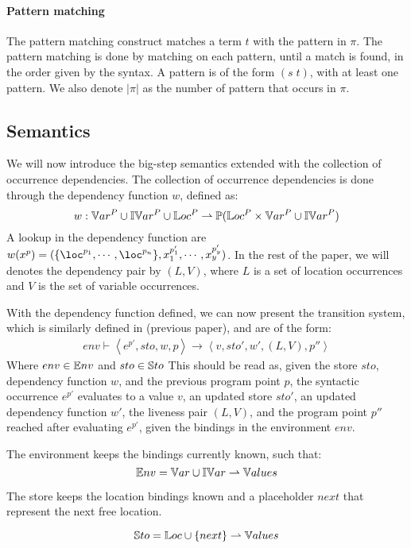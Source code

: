 \documentclass[../../master.tex]{subfiles}
\begin{document}
\paragraph{Pattern matching}
The pattern matching construct matches a term $t$ with the pattern in $\pi$.
The pattern matching is done by matching on each pattern, until a match is found, in the order given by the syntax.
A pattern is of the form $(s\;t)$, with at least one pattern.
We also denote $|\pi|$ as the number of pattern that occurs in $\pi$.

\subsection{Semantics}\label{sec:sem}
We will now introduce the big-step semantics extended with the collection of occurrence dependencies.
The collection of occurrence dependencies is done through the dependency function $w$, defined as:
$$w:\mathbb{V}ar^P\cup\mathbb{IV}ar^P\cup\mathbb{L}oc^P\rightharpoonup\mathbb{P}(\mathbb{L}oc^P\times\mathbb{V}ar^P\cup\mathbb{IV}ar^P)$$
A lookup in the dependency function are $w(x^p)=(\{\loc^{p_1},\cdots,\loc^{p_n}\},x_1^{p'_1},\cdots,x_y^{p'_y})$.
In the rest of the paper, we will denotes the dependency pair by $(L,V)$, where $L$ is a set of location occurrences and $V$ is the set of variable occurrences.

With the dependency function defined, we can now present the transition system, which is similarly defined in (previous paper), and are of the form:
\begin{align*}
env\vdash\left\langle e^{p'},sto,w,p\right\rangle\rightarrow\left\langle v,sto',w',(L,V),p''\right\rangle
\end{align*}
Where $env\in\mathbb{E}nv$ and $sto\in\mathbb{S}to$
This should be read as, given the store $sto$, dependency function $w$, and the previous program point $p$, the syntactic occurrence $e^{p'}$ evaluates to a value $v$, an updated store $sto'$, an updated dependency function $w'$, the liveness pair $(L,V)$, and the program point $p''$ reached after evaluating $e^{p'}$, given the bindings in the environment $env$.

The environment keeps the bindings currently known, such that:
$$\mathbb{E}nv=\mathbb{V}ar\cup\mathbb{IV}ar\rightharpoonup\mathbb{V}alues$$

The store keeps the location bindings known and a placeholder $next$ that represent the next free location.

$$\mathbb{S}to=\mathbb{L}oc\cup\{next\}\rightharpoonup\mathbb{V}alues$$
\end{document}
